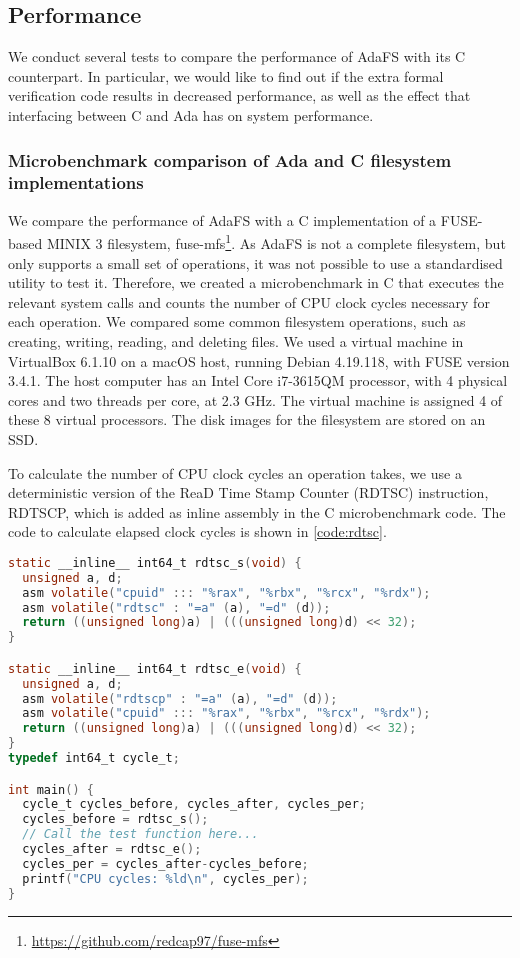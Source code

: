 \subsection{Performance}
We conduct several tests to compare the performance of AdaFS with its C counterpart.
In particular, we would like to find out if the extra formal verification code results in decreased performance, as well as the effect that interfacing between C and Ada has on system performance.

\subsubsection{Microbenchmark comparison of Ada and C filesystem implementations}
We compare the performance of AdaFS with a C implementation of a FUSE-based MINIX 3 filesystem, fuse-mfs\footnote{\url{https://github.com/redcap97/fuse-mfs}}.
As AdaFS is not a complete filesystem, but only supports a small set of operations, it was not possible to use a standardised utility to test it.
Therefore, we created a microbenchmark in C that executes the relevant system calls and counts the number of CPU clock cycles necessary for each operation.
We compared some common filesystem operations, such as creating, writing, reading, and deleting files.
We used a virtual machine in VirtualBox 6.1.10 on a macOS host, running Debian 4.19.118, with FUSE version 3.4.1.
The host computer has an Intel Core i7-3615QM processor, with 4 physical cores and two threads per core, at 2.3 GHz.
The virtual machine is assigned 4 of these 8 virtual processors.
The disk images for the filesystem are stored on an SSD.

To calculate the number of CPU clock cycles an operation takes, we use a deterministic version of the ReaD Time Stamp Counter (RDTSC) instruction, RDTSCP, which is added as inline assembly in the C microbenchmark code.
The code to calculate elapsed clock cycles is shown in \autoref{code:rdtsc}.

\begin{lstlisting}[float=tb,caption={Calculating clock cycles}, label={code:rdtsc}, language=C]
static __inline__ int64_t rdtsc_s(void) {
  unsigned a, d;
  asm volatile("cpuid" ::: "%rax", "%rbx", "%rcx", "%rdx");
  asm volatile("rdtsc" : "=a" (a), "=d" (d));
  return ((unsigned long)a) | (((unsigned long)d) << 32);
}

static __inline__ int64_t rdtsc_e(void) {
  unsigned a, d;
  asm volatile("rdtscp" : "=a" (a), "=d" (d));
  asm volatile("cpuid" ::: "%rax", "%rbx", "%rcx", "%rdx");
  return ((unsigned long)a) | (((unsigned long)d) << 32);
}
typedef int64_t cycle_t;

int main() {
  cycle_t cycles_before, cycles_after, cycles_per;
  cycles_before = rdtsc_s();
  // Call the test function here...
  cycles_after = rdtsc_e();
  cycles_per = cycles_after-cycles_before;
  printf("CPU cycles: %ld\n", cycles_per);
}
\end{lstlisting}

